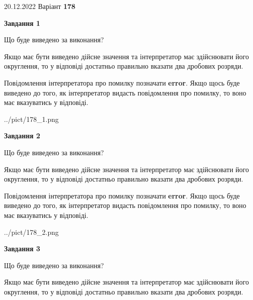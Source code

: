 \documentclass[12pt, ukrainian]{article}
\begin{document}
{20.12.2022 Варіант \No \textbf { 178 }\par}
{
\begin {Large}

{\begin {center}\textbf{Завдання 1}\end {center}}\par
Що буде виведено за виконання? \par

Якщо має бути виведено дійсне значення та інтерпретатор має здійснювати його округлення, 
то у відповіді достатньо правильно вказати два дробових розряди.

Повідомлення інтерпретатора про помилку позначати \textbf{error}.
Якщо щось буде виведено до того, як інтерпретатор видасть повідомлення про помилку, 
то воно має вказуватись у відповіді. \par

\begin{center}
	{../pict/178_1.png}
\end{center}
\newpage

{\begin {center}\textbf{Завдання 2}\end {center}}\par
Що буде виведено за виконання? \par

Якщо має бути виведено дійсне значення та інтерпретатор має здійснювати його округлення, 
то у відповіді достатньо правильно вказати два дробових розряди.

Повідомлення інтерпретатора про помилку позначати \textbf{error}.
Якщо щось буде виведено до того, як інтерпретатор видасть повідомлення про помилку, 
то воно має вказуватись у відповіді. \par

\begin{center}
	{../pict/178_2.png}
\end{center}
\newpage

{\begin {center}\textbf{Завдання 3}\end {center}}\par
Що буде виведено за виконання? \par

Якщо має бути виведено дійсне значення та інтерпретатор має здійснювати його округлення, 
то у відповіді достатньо правильно вказати два дробових розряди.


\end{Large}}
\end{document}
